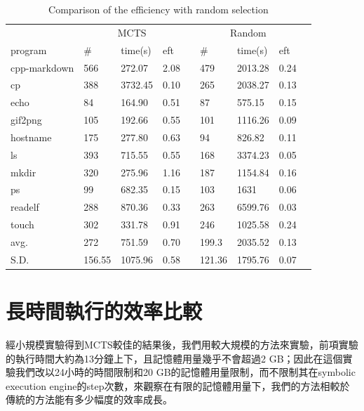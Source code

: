 \documentclass[12pt,a4paper,oneside]{book}
\begin{document}
\begin{table}[htbp]
\centering
\caption{Comparison of the efficiency with random selection}
\label{testRandomSeletion}
\begin{tabular}{@{}lllllllll@{}} \toprule
             & \multicolumn{3}{c}{MCTS} & \phantom{abc} & \multicolumn{3}{c}{Random} \\ \cmidrule{2-4} \cmidrule{6-8}
program      & \#   & time(s)   & eft   & & \#   & time(s) & eft  \\ \midrule
cpp-markdown & 566    & 272.07 & 2.08 & & 479    &2013.28& 0.24     \\
cp           & 388    & 3732.45& 0.10 & & 265    &2038.27& 0.13     \\
echo         &  84    & 164.90 & 0.51 & &  87    & 575.15& 0.15     \\
gif2png      & 105    & 192.66 & 0.55 & & 101    &1116.26& 0.09     \\ 
hostname     & 175    & 277.80 & 0.63 & &  94    & 826.82& 0.11     \\
ls           & 393    & 715.55 & 0.55 & & 168    &3374.23& 0.05     \\
mkdir        & 320    & 275.96 & 1.16 & & 187    &1154.84& 0.16     \\
ps           &  99    & 682.35 & 0.15 & & 103    &1631   & 0.06     \\
readelf      & 288    & 870.36 & 0.33 & & 263    &6599.76& 0.03     \\
touch        & 302    & 331.78 & 0.91 & & 246    &1025.58& 0.24     \\ \hline
avg.         & 272    & 751.59 & 0.70 & & 199.3  &2035.52& 0.13     \\
S.D.         & 156.55 &1075.96 & 0.58 & & 121.36 &1795.76& 0.07     \\ \bottomrule
\end{tabular}
\end{table}

\section{長時間執行的效率比較}

經小規模實驗得到MCTS較佳的結果後，我們用較大規模的方法來實驗，前項實驗的執行時間大約為13分鐘上下，且記憶體用量幾乎不會超過2 GB；因此在這個實驗我們改以24小時的時間限制和20 GB的記憶體用量限制，而不限制其在symbolic execution engine的step次數，來觀察在有限的記憶體用量下，我們的方法相較於傳統的方法能有多少幅度的效率成長。
\end{document}
